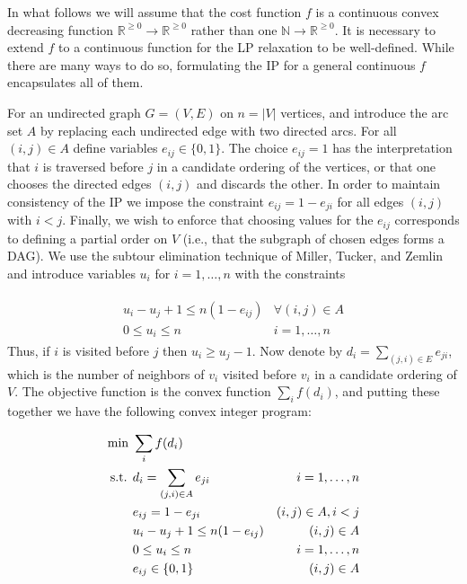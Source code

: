 \documentclass[english]{llncs}
\begin{document}
In what follows we will assume that the cost function $f$ is a continuous
convex decreasing function $\mathbb{R}^{\geq 0} \to \mathbb{R}^{\geq 0}$ rather
than one $\mathbb{N} \to \mathbb{R}^{\geq 0}$. It is necessary to extend $f$ to
a continuous function for the LP relaxation to be well-defined.  While there
are many ways to do so, formulating the IP for a general continuous $f$
encapsulates all of them.

For an undirected graph $G = (V,E)$ on $n = |V|$ vertices, and introduce the
arc set $A$ by replacing each undirected edge with two directed arcs.  For all
$(i,j)\in A$ define variables $e_{ij} \in \{ 0,1 \}$.  The choice $e_{ij} = 1$
has the interpretation that $i$ is traversed before $j$ in a candidate ordering
of the vertices, or that one chooses the directed edges $(i,j)$ and discards
the other. In order to maintain consistency of the IP we impose the constraint
$e_{ij} = 1 - e_{ji}$ for all edges $(i,j)$ with $i < j$. Finally, we wish to
enforce that choosing values for the $e_{ij}$ corresponds to defining a partial
order on $V$ (i.e., that the subgraph of chosen edges forms a DAG). We use the
subtour elimination technique of Miller, Tucker, and Zemlin
\cite{miller1960integer} and introduce variables $u_i$ for $i = 1, \dots, n$
with the constraints

\begin{align}
\label{eq:dag-constraint}
\begin{matrix}
   u_i - u_j + 1 \leq n (1 - e_{ij}) & \forall (i,j) \in A \\ 
   0 \leq u_i \leq n & i = 1, \dots, n 
\end{matrix}
\end{align}
\noindent Thus, if $i$ is visited before $j$ then $u_i \geq u_j - 1$.
Now denote by $d_i = \sum_{(j,i) \in E} e_{ji}$, which is the number of
neighbors of $v_i$ visited before $v_i$ in a candidate ordering of $V$. The
objective function is the convex function $\sum_{i} f(d_i)$, and putting these
together we have the following convex integer program: %

\begin{figure}[th]
\begin{centering}
\begin{align*}
\textup{min }  & \sum_i f(d_i)                       & \\ 
\textup{s.t. } & d_i = \sum_{(j,i) \in A} e_{ji}     & i = 1, \dots, n \\ 
               & e_{ij} = 1 - e_{ji}                 & (i,j) \in A, i < j \\ 
               & u_i - u_j + 1 \leq n (1 - e_{ij})   & (i,j) \in A \\ 
               & 0 \leq u_i \leq n                   & i = 1, \dots, n \\ 
               & e_{ij} \in \{0,1\}                    & (i,j) \in A
\end{align*}
\end{centering}
\end{figure}
\end{document}
